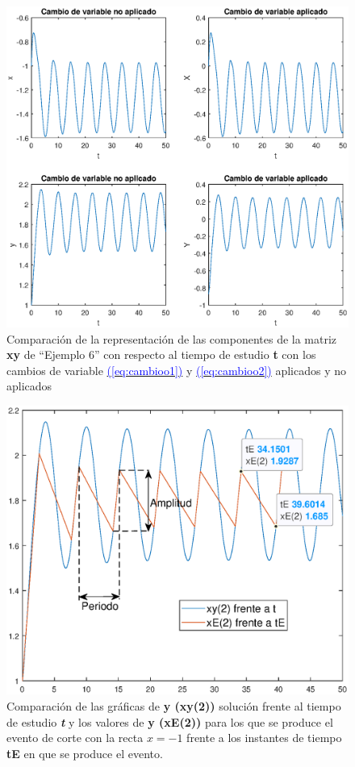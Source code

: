 \documentclass[12pt,a4paper]{report} %
\newcommand{\eref}[1]{\hyperref[#1]{\textcolor{blue}{(\ref*{#1})}}}
\begin{document}
    \begin{figure}[h]
    	\centering
    	\includegraphics[width=1.2\textwidth,center]{g2ejem6tiempo.eps}
    	\caption{Comparación de la representación de las componentes de la matriz \textbf{xy} de ``Ejemplo 6'' con respecto al tiempo de estudio \textbf{t} con los cambios de variable \eref{eq:cambioo1} y \eref{eq:cambioo2} aplicados y no aplicados}
    	\label{fig:g2ejem6}
    \end{figure}\smallskip
	
	\newpage
	
	\begin{figure}[h]
		\centering
		\includegraphics[width=1.1\textwidth,center]{g3ejem6tiempo.eps}
		\caption{Comparación de las gráficas de \textbf{y (xy(2))} solución frente al tiempo de estudio \textit{\textbf{t}} y los valores de \textbf{y (xE(2))} para los que se produce el evento de corte con la recta $x=-1$ frente a los instantes de tiempo \textbf{tE} en que se produce el evento.}
		\label{fig:g3ejem6}
	\end{figure}\smallskip
	
\end{document}
